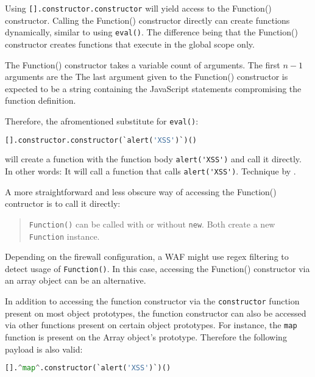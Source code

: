 Using \verb|[].constructor.constructor| will yield access to the Function() constructor.
Calling the Function() constructor directly can create functions dynamically, similar to using \verb|eval()|.
The difference being that the Function() constructor creates functions that execute in the global scope only.

The Function() constructor takes a variable count of arguments. The first $n - 1$ arguments are the  \cite{js/function}
The last argument given to the Function() constructor is expected to be a string containing the JavaScript statements compromising the function definition. \cite{js/function}

Therefore, the afromentioned substitute for \verb|eval()|: 

\begin{lstlisting}[style=basicStyle,language=Python]
[].constructor.constructor(`alert('XSS')`)()
\end{lstlisting}

will create a function with the function body \verb|alert('XSS')| and call it directly.
In other words: It will call a function that calls \verb|alert('XSS')|.
Technique by \cite{onecons/wafbypass}.

A more straightforward and less obscure way of accessing the Function() contructor is to call it directly:
\begin{quote}
	\verb|Function()| can be called with or without \verb|new|. Both create a new \verb|Function| instance. \cite{js/function}
\end{quote}
Depending on the firewall configuration, a WAF might use regex filtering to detect usage of \verb|Function()|.
In this case, accessing the Function() constructor via an array object can be an alternative.

In addition to accessing the function constructor via the \verb|constructor| function present on most object prototypes, the function constructor can also be accessed via other functions present on certain object prototypes. For instance, the \verb|map| function is present on the Array object's prototype. Therefore the following payload is also valid: 

\begin{lstlisting}[style=basicStyle,language=Python,escapeinside=\^\^]
[].^map^.constructor(`alert('XSS')`)()
\end{lstlisting}


